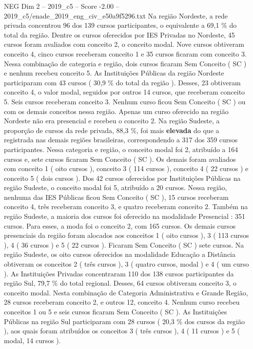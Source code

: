 \begin{textsample}{NEG Dim 2 – 2019\_c5 – Score -2.00 – 2019\_c5/enade\_2019\_eng\_civ\_e50a9f5296.txt}
Na região Nordeste, a rede privada concentrou 96 dos 139 cursos participantes, o equivalente a 69,1 \% do total da região.
Dentre os cursos oferecidos por IES Privadas no Nordeste, 45 cursos foram avaliados com conceito 2, o conceito modal.
Nove cursos obtiveram conceito 4, cinco cursos receberam conceito 1 e 35 cursos ficaram com conceito 3.
Nessa combinação de categoria e região, dois cursos ficaram Sem Conceito ( SC ) e nenhum recebeu conceito 5.
As Instituições Públicas da região Nordeste participaram com 43 cursos ( 30,9 \% do total da região ).
Desses, 23 obtiveram conceito 4, o valor modal, seguidos por outros 14 cursos, que receberam conceito 5.
Seis cursos receberam conceito 3.
Nenhum curso ficou Sem Conceito ( SC ) ou com os demais conceitos nessa região.
Apenas um curso oferecido na região Nordeste não era presencial e recebeu o conceito 2.
Na região Sudeste, a proporção de cursos da rede privada, 88,3 \%, foi mais \textbf{elevada} do que a registrada nas demais regiões brasileiras, correspondendo a 317 dos 359 cursos participantes.
Nessa categoria e região, o conceito modal foi 2, atribuído a 164 cursos e, sete cursos ficaram Sem Conceito ( SC ).
Os demais foram avaliados com conceito 1 ( oito cursos ), conceito 3 ( 114 cursos ), conceito 4 ( 22 cursos ) e conceito 5 ( dois cursos ).
Dos 42 cursos oferecidos por Instituições Públicas na região Sudeste, o conceito modal foi 5, atribuído a 20 cursos.
Nessa região, nenhuma das IES Públicas ficou Sem Conceito ( SC ), 15 cursos receberam conceito 4, três receberam conceito 3, e quatro receberam conceito 2.
Também na região Sudeste, a maioria dos cursos foi oferecido na modalidade Presencial : 351 cursos.
Para esses, a moda foi o conceito 2, com 165 cursos.
Os demais cursos presenciais da região foram alocados aos conceitos 1 ( oito cursos ), 3 ( 113 cursos ), 4 ( 36 cursos ) e 5 ( 22 cursos ).
Ficaram Sem Conceito ( SC ) sete cursos.
Na região Sudeste, os oito cursos oferecidos na modalidade Educação a Distância obtiveram os conceitos 2 ( três cursos ), 3 ( quatro cursos, modal ) e 4 ( um curso ).
As Instituições Privadas concentraram 110 dos 138 cursos participantes da região Sul, 79,7 \% do total regional.
Desses, 64 cursos obtiveram conceito 3, o conceito modal.
Nesta combinação de Categoria Administrativa e Grande Região, 28 cursos receberam conceito 2, e outros 12, conceito 4.
Nenhum curso recebeu conceitos 1 ou 5 e seis cursos ficaram Sem Conceito ( SC ).
As Instituições Públicas na região Sul participaram com 28 cursos ( 20,3 \% dos cursos da região ), aos quais foram atribuídos os conceitos 3 ( três cursos ), 4 ( 11 cursos ) e 5 ( modal, 14 cursos ).

\end{textsample}
